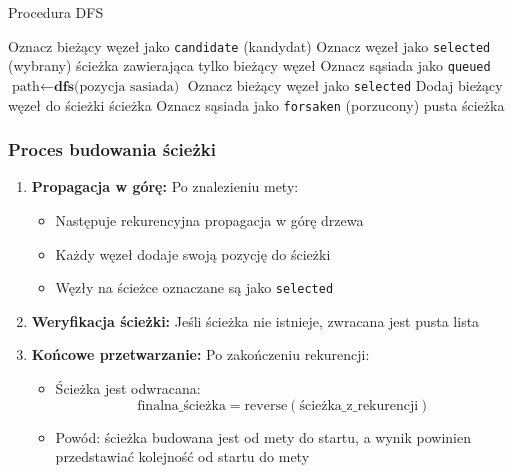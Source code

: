 \documentclass[../../../../doc.tex]{subfiles}
\begin{document}
\begin{algorithm}
  \caption{Procedura DFS}
  \begin{algorithmic}
    \STATE Oznacz bieżący węzeł jako \texttt{candidate} (kandydat)
    \STATE Oznacz węzeł jako \texttt{selected} (wybrany)
    \RETURN ścieżka zawierająca tylko bieżący węzeł
    \ENDIF
    \STATE Oznacz sąsiada jako \texttt{queued}
    \STATE $\text{path} \leftarrow \textbf{dfs}\text{(pozycja sasiada)}$
    \STATE Oznacz bieżący węzeł jako \texttt{selected}
    \STATE Dodaj bieżący węzeł do ścieżki
    \RETURN ścieżka
    \ELSE
    \STATE Oznacz sąsiada jako \texttt{forsaken} (porzucony)
    \ENDIF
    \ENDIF
    \ENDFOR
    \RETURN pusta ścieżka
  \end{algorithmic}
\end{algorithm}

\subsubsection{Proces budowania ścieżki}
\begin{enumerate}
  \item \textbf{Propagacja w górę:} Po znalezieniu mety:
        \begin{itemize}
          \item Następuje rekurencyjna propagacja w górę drzewa
          \item Każdy węzeł dodaje swoją pozycję do ścieżki
          \item Węzły na ścieżce oznaczane są jako \texttt{selected}
        \end{itemize}
  \item \textbf{Weryfikacja ścieżki:} Jeśli ścieżka nie istnieje, zwracana jest pusta lista
  \item \textbf{Końcowe przetwarzanie:} Po zakończeniu rekurencji:
        \begin{itemize}
          \item Ścieżka jest odwracana:
                \[ \text{finalna\_ścieżka} = \mathrm{reverse}(\text{ścieżka\_z\_rekurencji}) \]
          \item Powód: ścieżka budowana jest od mety do startu, a wynik powinien przedstawiać kolejność od startu do mety
        \end{itemize}
\end{enumerate}
\end{document}
